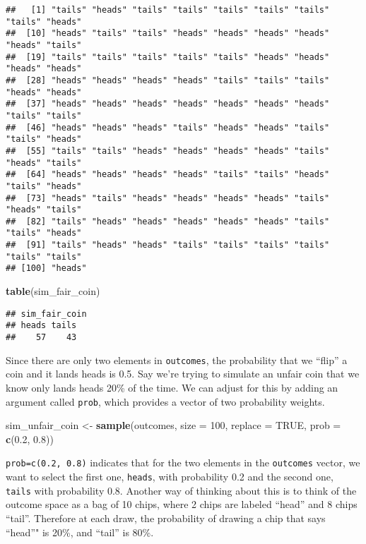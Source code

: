 \documentclass[
]{article}
\newenvironment{Shaded}{\begin{snugshade}}{\end{snugshade}}
\newcommand{\DataTypeTok}[1]{\textcolor[rgb]{0.13,0.29,0.53}{#1}}
\newcommand{\DecValTok}[1]{\textcolor[rgb]{0.00,0.00,0.81}{#1}}
\newcommand{\FloatTok}[1]{\textcolor[rgb]{0.00,0.00,0.81}{#1}}
\newcommand{\KeywordTok}[1]{\textcolor[rgb]{0.13,0.29,0.53}{\textbf{#1}}}
\newcommand{\NormalTok}[1]{#1}
\newcommand{\OtherTok}[1]{\textcolor[rgb]{0.56,0.35,0.01}{#1}}
\newcommand{\StringTok}[1]{\textcolor[rgb]{0.31,0.60,0.02}{#1}}
\begin{document}
\begin{verbatim}
##   [1] "tails" "heads" "tails" "tails" "tails" "tails" "tails" "tails" "heads"
##  [10] "heads" "tails" "tails" "heads" "heads" "heads" "heads" "heads" "tails"
##  [19] "tails" "tails" "tails" "tails" "tails" "heads" "heads" "heads" "heads"
##  [28] "heads" "heads" "heads" "heads" "tails" "tails" "tails" "heads" "heads"
##  [37] "heads" "heads" "heads" "heads" "heads" "heads" "heads" "tails" "tails"
##  [46] "heads" "heads" "heads" "tails" "heads" "heads" "tails" "tails" "heads"
##  [55] "tails" "tails" "heads" "heads" "heads" "heads" "tails" "heads" "tails"
##  [64] "heads" "heads" "heads" "heads" "tails" "tails" "heads" "tails" "heads"
##  [73] "heads" "tails" "heads" "heads" "heads" "heads" "tails" "heads" "tails"
##  [82] "tails" "heads" "heads" "heads" "heads" "heads" "tails" "tails" "heads"
##  [91] "tails" "heads" "heads" "tails" "tails" "tails" "tails" "tails" "tails"
## [100] "heads"
\end{verbatim}

\begin{Shaded}
\begin{Highlighting}[]
\KeywordTok{table}\NormalTok{(sim_fair_coin)}
\end{Highlighting}
\end{Shaded}

\begin{verbatim}
## sim_fair_coin
## heads tails 
##    57    43
\end{verbatim}

Since there are only two elements in \texttt{outcomes}, the probability
that we ``flip'' a coin and it lands heads is 0.5. Say we're trying to
simulate an unfair coin that we know only lands heads 20\% of the time.
We can adjust for this by adding an argument called \texttt{prob}, which
provides a vector of two probability weights.

\begin{Shaded}
\begin{Highlighting}[]
\NormalTok{sim_unfair_coin <-}\StringTok{ }\KeywordTok{sample}\NormalTok{(outcomes, }\DataTypeTok{size =} \DecValTok{100}\NormalTok{, }\DataTypeTok{replace =} \OtherTok{TRUE}\NormalTok{, }\DataTypeTok{prob =} \KeywordTok{c}\NormalTok{(}\FloatTok{0.2}\NormalTok{, }\FloatTok{0.8}\NormalTok{))}
\end{Highlighting}
\end{Shaded}

\texttt{prob=c(0.2,\ 0.8)} indicates that for the two elements in the
\texttt{outcomes} vector, we want to select the first one,
\texttt{heads}, with probability 0.2 and the second one, \texttt{tails}
with probability 0.8. Another way of thinking about this is to think of
the outcome space as a bag of 10 chips, where 2 chips are labeled
``head'' and 8 chips ``tail''. Therefore at each draw, the probability
of drawing a chip that says ``head''" is 20\%, and ``tail'' is 80\%.
\end{document}
